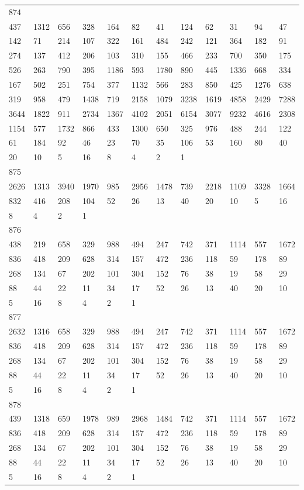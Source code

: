 \begin{longtable}{llllllllllll}
874&&&&&&&&&&&\\
437& 1312& 656& 328& 164& 82& 41& 124& 62& 31& 94& 47\\
142& 71& 214& 107& 322& 161& 484& 242& 121& 364& 182& 91\\
274& 137& 412& 206& 103& 310& 155& 466& 233& 700& 350& 175\\
526& 263& 790& 395& 1186& 593& 1780& 890& 445& 1336& 668& 334\\
167& 502& 251& 754& 377& 1132& 566& 283& 850& 425& 1276& 638\\
319& 958& 479& 1438& 719& 2158& 1079& 3238& 1619& 4858& 2429& 7288\\
3644& 1822& 911& 2734& 1367& 4102& 2051& 6154& 3077& 9232& 4616& 2308\\
1154& 577& 1732& 866& 433& 1300& 650& 325& 976& 488& 244& 122\\
61& 184& 92& 46& 23& 70& 35& 106& 53& 160& 80& 40\\
20& 10& 5& 16& 8& 4& 2& 1& \\

875&&&&&&&&&&&\\
2626& 1313& 3940& 1970& 985& 2956& 1478& 739& 2218& 1109& 3328& 1664\\
832& 416& 208& 104& 52& 26& 13& 40& 20& 10& 5& 16\\
8& 4& 2& 1& \\

876&&&&&&&&&&&\\
438& 219& 658& 329& 988& 494& 247& 742& 371& 1114& 557& 1672\\
836& 418& 209& 628& 314& 157& 472& 236& 118& 59& 178& 89\\
268& 134& 67& 202& 101& 304& 152& 76& 38& 19& 58& 29\\
88& 44& 22& 11& 34& 17& 52& 26& 13& 40& 20& 10\\
5& 16& 8& 4& 2& 1& \\

877&&&&&&&&&&&\\
2632& 1316& 658& 329& 988& 494& 247& 742& 371& 1114& 557& 1672\\
836& 418& 209& 628& 314& 157& 472& 236& 118& 59& 178& 89\\
268& 134& 67& 202& 101& 304& 152& 76& 38& 19& 58& 29\\
88& 44& 22& 11& 34& 17& 52& 26& 13& 40& 20& 10\\
5& 16& 8& 4& 2& 1& \\

878&&&&&&&&&&&\\
439& 1318& 659& 1978& 989& 2968& 1484& 742& 371& 1114& 557& 1672\\
836& 418& 209& 628& 314& 157& 472& 236& 118& 59& 178& 89\\
268& 134& 67& 202& 101& 304& 152& 76& 38& 19& 58& 29\\
88& 44& 22& 11& 34& 17& 52& 26& 13& 40& 20& 10\\
5& 16& 8& 4& 2& 1& \\


\end{longtable}
